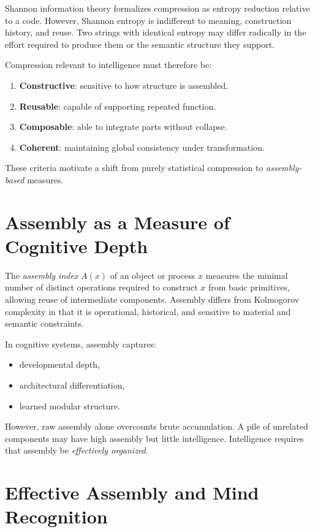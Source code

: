 \documentclass[11pt,letterpaper]{article}
\begin{document}
Shannon information theory formalizes compression as entropy reduction relative to a code. However, Shannon entropy is indifferent to meaning, construction history, and reuse. Two strings with identical entropy may differ radically in the effort required to produce them or the semantic structure they support.

Compression relevant to intelligence must therefore be:
\begin{enumerate}
  \item \textbf{Constructive}: sensitive to how structure is assembled.
  \item \textbf{Reusable}: capable of supporting repeated function.
  \item \textbf{Composable}: able to integrate parts without collapse.
  \item \textbf{Coherent}: maintaining global consistency under transformation.
\end{enumerate}

These criteria motivate a shift from purely statistical compression to \emph{assembly-based} measures.

\section{Assembly as a Measure of Cognitive Depth}

The \emph{assembly index} $A(x)$ of an object or process $x$ measures the minimal number of distinct operations required to construct $x$ from basic primitives, allowing reuse of intermediate components. Assembly differs from Kolmogorov complexity in that it is operational, historical, and sensitive to material and semantic constraints.

In cognitive systems, assembly captures:
\begin{itemize}
  \item developmental depth,
  \item architectural differentiation,
  \item learned modular structure.
\end{itemize}

However, raw assembly alone overcounts brute accumulation. A pile of unrelated components may have high assembly but little intelligence. Intelligence requires that assembly be \emph{effectively organized}.

\section{Effective Assembly and Mind Recognition}
\end{document}

